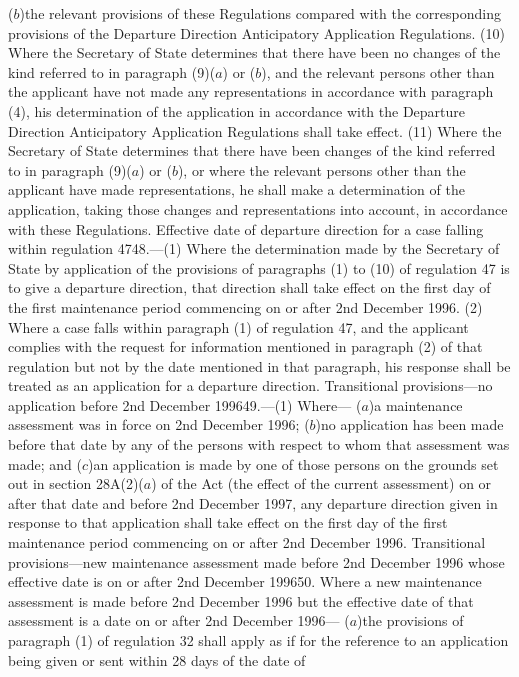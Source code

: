 \documentclass[a4paper]{article}
\begin{document}
($b$)the relevant provisions of these Regulations compared with the corresponding
provisions of the Departure Direction Anticipatory Application Regulations.
(10) Where the Secretary of State determines that there have been no changes of
the kind referred to in paragraph (9)($a$) or ($b$), and the relevant persons other
than the applicant have not made any representations in accordance with
paragraph (4), his determination of the application in accordance with the
Departure Direction Anticipatory Application Regulations shall take effect.
(11) Where the Secretary of State determines that there have been changes of the
kind referred to in paragraph (9)($a$) or ($b$), or where the relevant persons other
than the applicant have made representations, he shall make a determination of
the application, taking those changes and representations into account, in
accordance with these Regulations.
Effective date of departure direction for a case falling within regulation
4748.—(1) Where the determination made by the Secretary of State by application
of the provisions of paragraphs (1) to (10) of regulation 47 is to give a
departure direction, that direction shall take effect on the first day of the
first maintenance period commencing on or after 2nd December 1996.
(2) Where a case falls within paragraph (1) of regulation 47, and the applicant
complies with the request for information mentioned in paragraph (2) of that
regulation but not by the date mentioned in that paragraph, his response shall
be treated as an application for a departure direction.
Transitional provisions—no application before 2nd December 199649.—(1) Where—
($a$)a maintenance assessment was in force on 2nd December 1996;
($b$)no application has been made before that date by any of the persons with
respect to whom that assessment was made; and
($c$)an application is made by one of those persons on the grounds set out in
section 28A(2)($a$) of the Act (the effect of the current assessment) on or after
that date and before 2nd December 1997,
any departure direction given in response to that application shall take effect
on the first day of the first maintenance period commencing on or after 2nd
December 1996.
Transitional provisions—new maintenance assessment made before 2nd December 1996
whose effective date is on or after 2nd December 199650. Where a new maintenance
assessment is made before 2nd December 1996 but the effective date of that
assessment is a date on or after 2nd December 1996—
($a$)the provisions of paragraph (1) of regulation 32 shall apply as if for the
reference to an application being given or sent within 28 days of the date of
\end{document}
